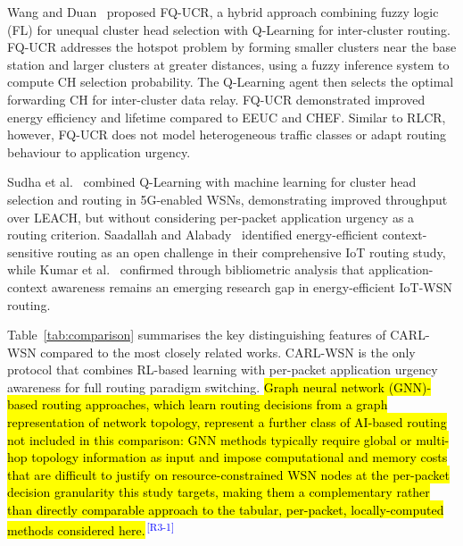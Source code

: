 \documentclass[12pt]{article}
\newcommand{\rtag}[1]{\textsuperscript{\textcolor{blue}{\scriptsize\,[#1]}}}
\newcommand{\hlx}[1]{{\exhyphenpenalty=10000\hyphenpenalty=10000\let\ \nobreakspace\hl{#1}}}
\begin{document}
Wang and Duan~\cite{wang_fqucr_2025} proposed FQ-UCR, a hybrid
approach combining fuzzy logic (FL) for unequal cluster head selection
with Q-Learning for inter-cluster routing. FQ-UCR addresses the
hotspot problem by forming smaller clusters near the base station
and larger clusters at greater distances, using a fuzzy inference
system to compute CH selection probability. The Q-Learning agent then
selects the optimal forwarding CH for inter-cluster data relay.
FQ-UCR demonstrated improved energy efficiency and lifetime compared
to EEUC and CHEF. Similar to RLCR, however, FQ-UCR does not model
heterogeneous traffic classes or adapt routing behaviour to
application urgency.

Sudha et al.~\cite{sudha_intelligent_2025} combined Q-Learning with
machine learning for cluster head selection and routing in 5G-enabled
WSNs, demonstrating improved throughput over LEACH, but without
considering per-packet application urgency as a routing criterion.
Saadallah and Alabady~\cite{saadallah_comprehensive_2024} identified
energy-efficient context-sensitive routing as an open challenge in
their comprehensive IoT routing study, while Kumar
et al.~\cite{kumar_exploring_2025} confirmed through bibliometric
analysis that application-context awareness remains an emerging
research gap in energy-efficient IoT-WSN routing.

Table~\ref{tab:comparison} summarises the key distinguishing features
of CARL-WSN compared to the most closely related works. CARL-WSN is
the only protocol that combines RL-based learning with per-packet
application urgency awareness for full routing paradigm switching.
\hlx{Graph neural network (GNN)-based routing approaches, which learn
routing decisions from a graph representation of network topology,
represent a further class of AI-based routing not included in this
comparison: GNN methods typically require global or multi-hop
topology information as input and impose computational and memory
costs that are difficult to justify on resource-constrained WSN
nodes at the per-packet decision granularity this study targets,
making them a complementary rather than directly comparable
approach to the tabular, per-packet, locally-computed methods
considered here.}\rtag{R3-1}
\end{document}
